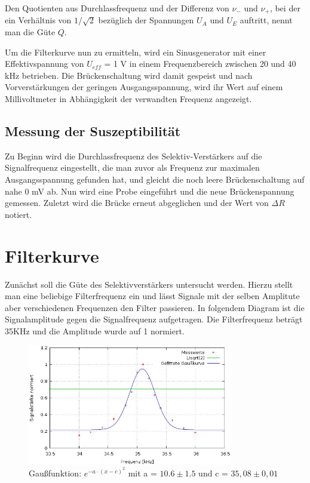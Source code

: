 Den Quotienten aus Durchlassfrequenz und der Differenz von $\nu_-$ und $\nu_+$, bei der ein Verhältnis von $1/\sqrt{2}$ bezüglich der 
Spannungen $U_A$ und $U_E$ auftritt, nennt man die Güte $Q$.

Um die Filterkurve nun zu ermitteln, wird ein Sinusgenerator mit einer Effektivspannung von $U_{eff}$ = 1 V in einem Frequenzbereich 
zwischen 20 und 40 kHz betrieben. Die Brückenschaltung wird damit gespeist und nach Vorverstärkungen der geringen Ausgangsspannung,
wird ihr Wert auf einem Millivoltmeter in Abhängigkeit der verwandten Frequenz angezeigt.

\subsection{Messung der Suszeptibilität}
Zu Beginn wird die Durchlassfrequenz des Selektiv-Verstärkers auf die Signalfrequenz eingestellt, die man zuvor als Frequenz zur maximalen
Ausgangsspannung gefunden hat, und gleicht die noch leere Brückenschaltung auf nahe 0 mV ab. Nun wird eine Probe eingeführt und die
neue Brückenspannung gemessen. Zuletzt wird die Brücke erneut abgeglichen und der Wert von $\Delta R$ notiert. 

\section{Filterkurve}
Zunächst soll die Güte des Selektivverstärkers untersucht werden. Hierzu stellt man eine beliebige Filterfrequenz ein und lässt Signale mit der selben Amplitute aber verschiedenen Frequenzen den Filter passieren. In folgendem Diagram ist die Signalamplitude gegen die Signalfrequenz aufgetragen. Die Filterfrequenz beträgt 35KHz und die Amplitude wurde auf 1 normiert.
\begin{figure}[htbp]
\includegraphics[width=0.8\textwidth]{pics/guete.jpg}
\caption{Gaußfunktion: $e^{-a\cdot (x-c)^2}$ mit a = $10.6\pm 1.5$ und c = $35,08 \pm 0,01$}
\end{figure}

